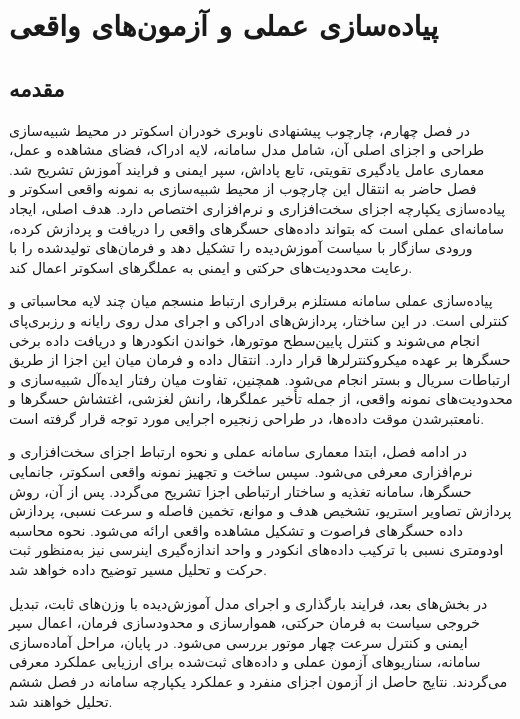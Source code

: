 \chapter{پیاده‌سازی عملی و آزمون‌های واقعی}

\section{مقدمه}
\label{sec:chapter5_intro}

در فصل چهارم، چارچوب پیشنهادی ناوبری خودران اسکوتر در محیط شبیه‌سازی طراحی و اجزای اصلی آن، شامل مدل سامانه، لایه ادراک، فضای مشاهده و عمل، معماری عامل یادگیری تقویتی، تابع پاداش، سپر ایمنی و فرایند آموزش تشریح شد. فصل حاضر به انتقال این چارچوب از محیط شبیه‌سازی به نمونه واقعی اسکوتر و پیاده‌سازی یکپارچه اجزای سخت‌افزاری و نرم‌افزاری اختصاص دارد. هدف اصلی، ایجاد سامانه‌ای عملی است که بتواند داده‌های حسگرهای واقعی را دریافت و پردازش کرده، ورودی سازگار با سیاست آموزش‌دیده را تشکیل دهد و فرمان‌های تولیدشده را با رعایت محدودیت‌های حرکتی و ایمنی به عملگرهای اسکوتر اعمال کند.

پیاده‌سازی عملی سامانه مستلزم برقراری ارتباط منسجم میان چند لایه محاسباتی و کنترلی است. در این ساختار، پردازش‌های ادراکی و اجرای مدل روی رایانه و رزبری‌پای انجام می‌شوند و کنترل پایین‌سطح موتورها، خواندن انکودرها و دریافت داده برخی حسگرها بر عهده میکروکنترلرها قرار دارد. انتقال داده و فرمان میان این اجزا از طریق ارتباطات سریال و بستر  انجام می‌شود. همچنین، تفاوت میان رفتار ایده‌آل شبیه‌سازی و محدودیت‌های نمونه واقعی، از جمله تأخیر عملگرها، رانش لغزشی، اغتشاش حسگرها و نامعتبرشدن موقت داده‌ها، در طراحی زنجیره اجرایی مورد توجه قرار گرفته است.

در ادامه فصل، ابتدا معماری سامانه عملی و نحوه ارتباط اجزای سخت‌افزاری و نرم‌افزاری معرفی می‌شود. سپس ساخت و تجهیز نمونه واقعی اسکوتر، جانمایی حسگرها، سامانه تغذیه و ساختار ارتباطی اجزا تشریح می‌گردد. پس از آن، روش پردازش تصاویر استریو، تشخیص هدف و موانع، تخمین فاصله و سرعت نسبی، پردازش داده حسگرهای فراصوت و تشکیل مشاهده واقعی ارائه می‌شود. نحوه محاسبه اودومتری نسبی با ترکیب داده‌های انکودر و واحد اندازه‌گیری اینرسی نیز به‌منظور ثبت حرکت و تحلیل مسیر توضیح داده خواهد شد.

در بخش‌های بعد، فرایند بارگذاری و اجرای مدل آموزش‌دیده با وزن‌های ثابت، تبدیل خروجی سیاست به فرمان حرکتی، هموارسازی و محدودسازی فرمان، اعمال سپر ایمنی و کنترل سرعت چهار موتور بررسی می‌شود. در پایان، مراحل آماده‌سازی سامانه، سناریوهای آزمون عملی و داده‌های ثبت‌شده برای ارزیابی عملکرد معرفی می‌گردند. نتایج حاصل از آزمون اجزای منفرد و عملکرد یکپارچه سامانه در فصل ششم تحلیل خواهند شد.


